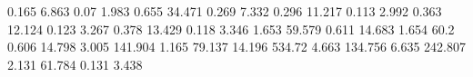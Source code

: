 0.165      6.863      %
0.07       1.983      %
0.655      34.471     %
0.269      7.332      %
0.296      11.217     %
0.113      2.992      %
0.363      12.124     %
0.123      3.267      %
0.378      13.429     %
0.118      3.346      %
1.653      59.579     %
0.611      14.683     %
1.654      60.2       %
0.606      14.798     %
3.005      141.904    %
1.165      79.137     %
14.196     534.72     %
4.663      134.756    %
6.635      242.807    %
2.131      61.784     %
0.131      3.438      %
